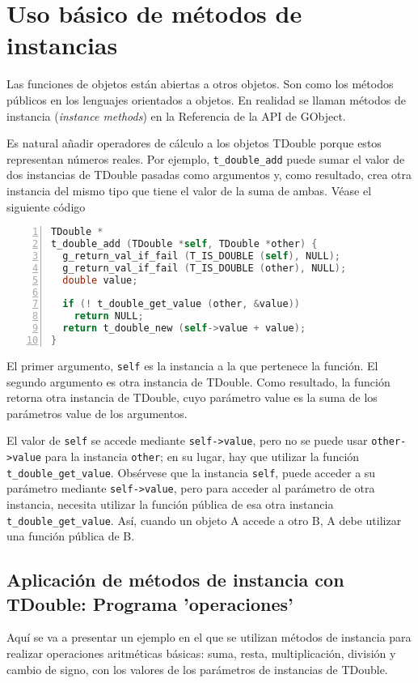 \section{Uso básico de métodos de instancias}
Las funciones de objetos están abiertas a otros objetos. Son como los métodos públicos en los lenguajes
orientados a objetos.
En realidad se llaman métodos de instancia (\emph{instance methods}) en la Referencia de la API de GObject.

Es natural añadir operadores de cálculo a los objetos \textsf{TDouble} porque estos representan números
reales. Por ejemplo, \texttt{t\_double\_add} puede sumar el valor de dos instancias de \textsf{TDouble}
pasadas como argumentos y, como resultado, crea otra instancia del mismo tipo que tiene el valor de la
suma de ambas. Véase  el siguiente código
\begin{lstlisting}[language=C, numbers=left]
TDouble *
t_double_add (TDouble *self, TDouble *other) {
  g_return_val_if_fail (T_IS_DOUBLE (self), NULL);
  g_return_val_if_fail (T_IS_DOUBLE (other), NULL);
  double value;

  if (! t_double_get_value (other, &value))
    return NULL;
  return t_double_new (self->value + value);
}
\end{lstlisting}
El primer argumento, \texttt{self} es la instancia a la que pertenece la función. El segundo argumento es otra
instancia de \textsf{TDouble}. Como resultado, la función retorna otra instancia de \textsf{TDouble}, cuyo
parámetro \textsf{value} es la suma de los parámetros \textsf{value} de los argumentos.

El valor de \texttt{self} se accede mediante \texttt{self->value}, pero no se puede usar \texttt{other->value}
para la instancia \texttt{other}; en su lugar, hay que utilizar la función \texttt{t\_double\_get\_value}.
Obsérvese que la instancia \texttt{self}, puede acceder a su parámetro mediante \texttt{self->value},
pero para acceder al parámetro de otra instancia, necesita utilizar la función pública de esa otra
instancia \texttt{t\_double\_get\_value}. Así, cuando un objeto A accede a otro B, A debe utilizar una
función pública de B.

\subsection{Aplicación de métodos de instancia con \textsf{TDouble}: Programa 'operaciones'}
Aquí se va a presentar un ejemplo en el que se utilizan métodos de instancia para realizar operaciones
aritméticas básicas: suma, resta, multiplicación, división y cambio de signo, con los valores de los
parámetros de instancias de \textsf{TDouble}.

